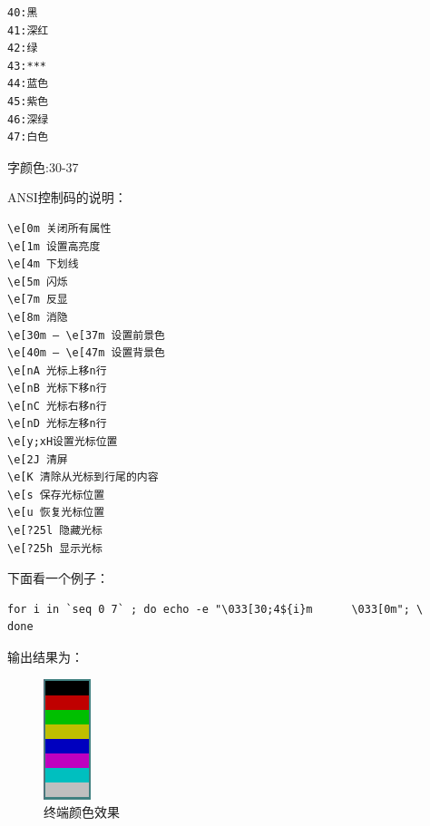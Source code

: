 \begin{verbatim}
40:黑 
41:深红 
42:绿 
43:*** 
44:蓝色 
45:紫色 
46:深绿 
47:白色
\end{verbatim}

字颜色:30-37

ANSI控制码的说明：

\begin{verbatim}
\e[0m 关闭所有属性 
\e[1m 设置高亮度 
\e[4m 下划线 
\e[5m 闪烁 
\e[7m 反显 
\e[8m 消隐 
\e[30m — \e[37m 设置前景色 
\e[40m — \e[47m 设置背景色 
\e[nA 光标上移n行 
\e[nB 光标下移n行 
\e[nC 光标右移n行 
\e[nD 光标左移n行 
\e[y;xH设置光标位置 
\e[2J 清屏 
\e[K 清除从光标到行尾的内容 
\e[s 保存光标位置 
\e[u 恢复光标位置 
\e[?25l 隐藏光标 
\e[?25h 显示光标
\end{verbatim}

下面看一个例子：
\begin{verbatim}
for i in `seq 0 7` ; do echo -e "\033[30;4${i}m      \033[0m"; \ 
done
\end{verbatim}

输出结果为：
\begin{figure}[hbtp]
  \centering
  \includegraphics[width=.15\textwidth]{img/color.png}
  \caption{终端颜色效果}
  \label{fig:TermColor}
\end{figure}